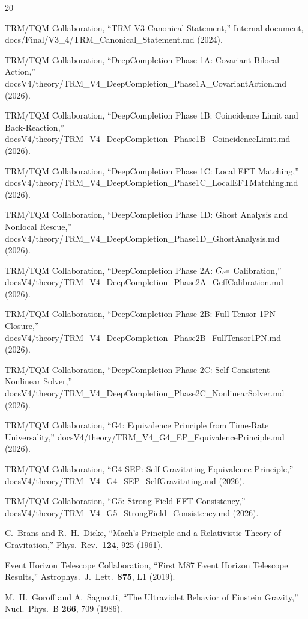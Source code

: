 \documentclass[12pt]{article}
\begin{document}

\begin{thebibliography}{20}

TRM/TQM Collaboration,
``TRM V3 Canonical Statement,''
Internal document, docs/Final/V3\_4/TRM\_Canonical\_Statement.md (2024).

TRM/TQM Collaboration,
``DeepCompletion Phase 1A: Covariant Bilocal Action,''
docsV4/theory/TRM\_V4\_DeepCompletion\_Phase1A\_CovariantAction.md (2026).

TRM/TQM Collaboration,
``DeepCompletion Phase 1B: Coincidence Limit and Back-Reaction,''
docsV4/theory/TRM\_V4\_DeepCompletion\_Phase1B\_CoincidenceLimit.md (2026).

TRM/TQM Collaboration,
``DeepCompletion Phase 1C: Local EFT Matching,''
docsV4/theory/TRM\_V4\_DeepCompletion\_Phase1C\_LocalEFTMatching.md (2026).

TRM/TQM Collaboration,
``DeepCompletion Phase 1D: Ghost Analysis and Nonlocal Rescue,''
docsV4/theory/TRM\_V4\_DeepCompletion\_Phase1D\_GhostAnalysis.md (2026).

TRM/TQM Collaboration,
``DeepCompletion Phase 2A: $G_{\rm eff}$ Calibration,''
docsV4/theory/TRM\_V4\_DeepCompletion\_Phase2A\_GeffCalibration.md (2026).

TRM/TQM Collaboration,
``DeepCompletion Phase 2B: Full Tensor 1PN Closure,''
docsV4/theory/TRM\_V4\_DeepCompletion\_Phase2B\_FullTensor1PN.md (2026).

TRM/TQM Collaboration,
``DeepCompletion Phase 2C: Self-Consistent Nonlinear Solver,''
docsV4/theory/TRM\_V4\_DeepCompletion\_Phase2C\_NonlinearSolver.md (2026).

TRM/TQM Collaboration,
``G4: Equivalence Principle from Time-Rate Universality,''
docsV4/theory/TRM\_V4\_G4\_EP\_EquivalencePrinciple.md (2026).

TRM/TQM Collaboration,
``G4-SEP: Self-Gravitating Equivalence Principle,''
docsV4/theory/TRM\_V4\_G4\_SEP\_SelfGravitating.md (2026).

TRM/TQM Collaboration,
``G5: Strong-Field EFT Consistency,''
docsV4/theory/TRM\_V4\_G5\_StrongField\_Consistency.md (2026).

C.~Brans and R.~H.~Dicke,
``Mach's Principle and a Relativistic Theory of Gravitation,''
Phys.\ Rev.\ \textbf{124}, 925 (1961).

Event Horizon Telescope Collaboration,
``First M87 Event Horizon Telescope Results,''
Astrophys.\ J.\ Lett.\ \textbf{875}, L1 (2019).

M.~H.~Goroff and A.~Sagnotti,
``The Ultraviolet Behavior of Einstein Gravity,''
Nucl.\ Phys.\ B \textbf{266}, 709 (1986).

\end{thebibliography}
\end{document}
